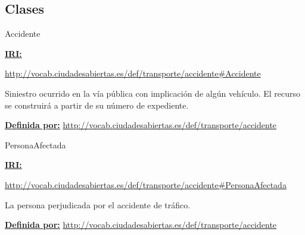 \subsection{Clases}



\begin{mybox}{Accidente}
\begin{flushleft}
\underline{\textbf{IRI:}}

\url{http://vocab.ciudadesabiertas.es/def/transporte/accidente#Accidente}
\newline

Siniestro ocurrido en la vía pública con implicación de algún vehículo. El recurso se construirá a partir de su número de expediente.
\newline

\underline{\textbf{Definida por:}}\newline
\url{http://vocab.ciudadesabiertas.es/def/transporte/accidente}
\newline




\end{flushleft}
\end{mybox}


\begin{mybox}{PersonaAfectada}
\begin{flushleft}
\underline{\textbf{IRI:}}

\url{http://vocab.ciudadesabiertas.es/def/transporte/accidente#PersonaAfectada}
\newline

La persona perjudicada por el accidente de tráfico.
\newline

\underline{\textbf{Definida por:}}
\newline
\url{http://vocab.ciudadesabiertas.es/def/transporte/accidente}
\newline

\end{flushleft}
\end{mybox}


